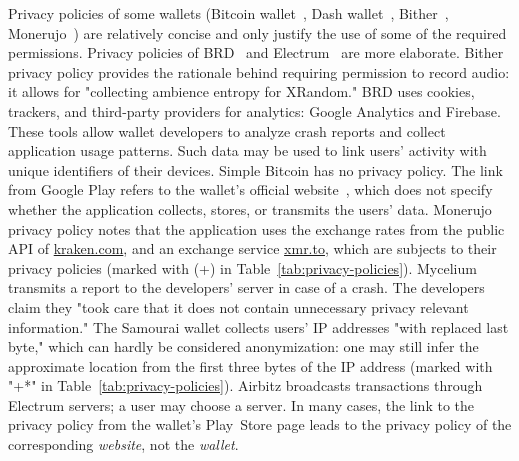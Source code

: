 Privacy policies of some wallets (Bitcoin wallet~\cite{BitcoinWalletPrivacyPolicy}, Dash wallet~\cite{DashWalletPrivacyPolicy}, Bither~\cite{BitherWalletPrivacyPolicy}, Monerujo~\cite{MonerujoPrivacyPolicy}) are relatively concise and only justify the use of some of the required permissions.
Privacy policies of BRD~\cite{BRDPrivacyPolicy} and Electrum~\cite{ElectrumPrivacyPolicy} are more elaborate.
Bither privacy policy provides the rationale behind requiring permission to record audio: it allows for "collecting ambience entropy for XRandom."
BRD uses cookies, trackers, and third-party providers for analytics: Google Analytics and Firebase.
These tools allow wallet developers to analyze crash reports and collect application usage patterns.
Such data may be used to link users' activity with unique identifiers of their devices.
Simple Bitcoin has no privacy policy.
The link from Google Play refers to the wallet's official website~\cite{SimpleBitcoin}, which does not specify whether the application collects, stores, or transmits the users' data.
Monerujo privacy policy notes that the application uses the exchange rates from the public API of \url{kraken.com}, and an exchange service \url{xmr.to}, which are subjects to their privacy policies (marked with (+) in Table~\ref{tab:privacy-policies}).
Mycelium transmits a report to the developers' server in case of a crash.
The developers claim they "took care that it does not contain unnecessary privacy relevant information."
The Samourai wallet collects users' IP addresses "with replaced last byte," which can hardly be considered anonymization: one may still infer the approximate location from the first three bytes of the IP address (marked with "+*" in Table~\ref{tab:privacy-policies}).
Airbitz broadcasts transactions through Electrum servers; a user may choose a server.
In many cases, the link to the privacy policy from the wallet's Play~Store page leads to the privacy policy of the corresponding \textit{website}, not the \textit{wallet}.

